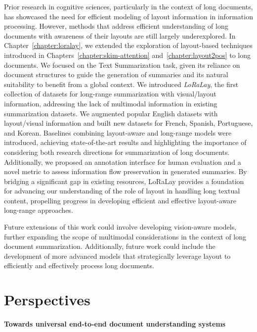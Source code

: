 Prior research in cognitive sciences, particularly in the context of long documents, has showcased the need for efficient modeling of layout information in information processing. However, methods that address efficient understanding of long documents with awareness of their layouts are still largely underexplored. In Chapter~\ref{chapter:loralay}, we extended the exploration of layout-based techniques introduced in Chapters~\ref{chapter:skim-attention} and~\ref{chapter:layout2pos} to long documents. We focused on the Text Summarization task, given its reliance on document structures to guide the generation of summaries and its natural suitability to benefit from a global context. We introduced \textit{LoRaLay}, the first collection of datasets for long-range summarization with visual/layout information, addressing the lack of multimodal information in existing summarization datasets. We augmented popular English datasets with layout/visual information and built new datasets for French, Spanish, Portuguese, and Korean. Baselines combining layout-aware and long-range models were introduced, achieving state-of-the-art results and highlighting the importance of considering both research directions for summarization of long documents. Additionally, we proposed an annotation interface for human evaluation and a novel metric to assess information flow preservation in generated summaries. By bridging a significant gap in existing resources, LoRaLay provides a foundation for advancing our understanding of the role of layout in handling long textual content, propelling progress in developing efficient and effective layout-aware long-range approaches.

Future extensions of this work could involve developing vision-aware models, further expanding the scope of multimodal considerations in the context of long document summarization. Additionally, future work could include the development of more advanced models that strategically leverage layout to efficiently and effectively process long documents.


\section{Perspectives}

\paragraph{Towards universal end-to-end document understanding systems}


